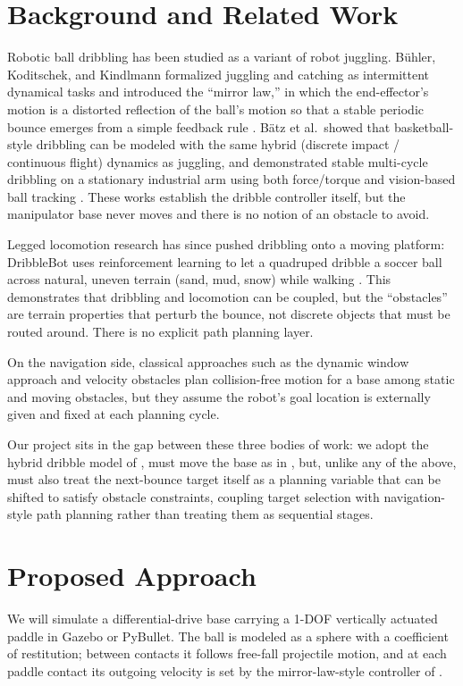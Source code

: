 \documentclass[10pt,twocolumn]{article}
\begin{document}
\section{Background and Related Work}
Robotic ball dribbling has been studied as a variant of robot juggling.
Bühler, Koditschek, and Kindlmann formalized juggling and catching as
intermittent dynamical tasks and introduced the ``mirror law,'' in which the
end-effector's motion is a distorted reflection of the ball's motion so that
a stable periodic bounce emerges from a simple feedback rule
\cite{buehler1994}. Bätz et al.\ showed that basketball-style dribbling can
be modeled with the same hybrid (discrete impact / continuous flight)
dynamics as juggling, and demonstrated stable multi-cycle dribbling on a
stationary industrial arm using both force/torque and vision-based ball
tracking \cite{batz2009,batz2009icra}. These works establish the dribble
controller itself, but the manipulator base never moves and there is no
notion of an obstacle to avoid.

Legged locomotion research has since pushed dribbling onto a moving
platform: DribbleBot uses reinforcement learning to let a quadruped dribble
a soccer ball across natural, uneven terrain (sand, mud, snow) while walking
\cite{dribblebot2023}. This demonstrates that dribbling and locomotion can
be coupled, but the ``obstacles'' are terrain properties that perturb the
bounce, not discrete objects that must be routed around. There is no
explicit path planning layer.

On the navigation side, classical approaches such as the dynamic window
approach \cite{fox1997} and velocity obstacles \cite{fiorini1998} plan
collision-free motion for a base among static and moving obstacles, but
they assume the robot's goal location is externally given and fixed at each
planning cycle.

Our project sits in the gap between these three bodies of work: we adopt
the hybrid dribble model of \cite{buehler1994,batz2009}, must move the base
as in \cite{dribblebot2023}, but, unlike any of the above, must also
treat the next-bounce target itself as a planning variable that can be
shifted to satisfy obstacle constraints, coupling target selection with
navigation-style path planning rather than treating them as sequential
stages.

\section{Proposed Approach}
We will simulate a differential-drive base carrying a 1-DOF vertically
actuated paddle in Gazebo or PyBullet. The ball is modeled as a sphere with
a coefficient of restitution; between contacts it follows free-fall
projectile motion, and at each paddle contact its outgoing velocity is set
by the mirror-law-style controller of \cite{buehler1994,batz2009}.
\end{document}
